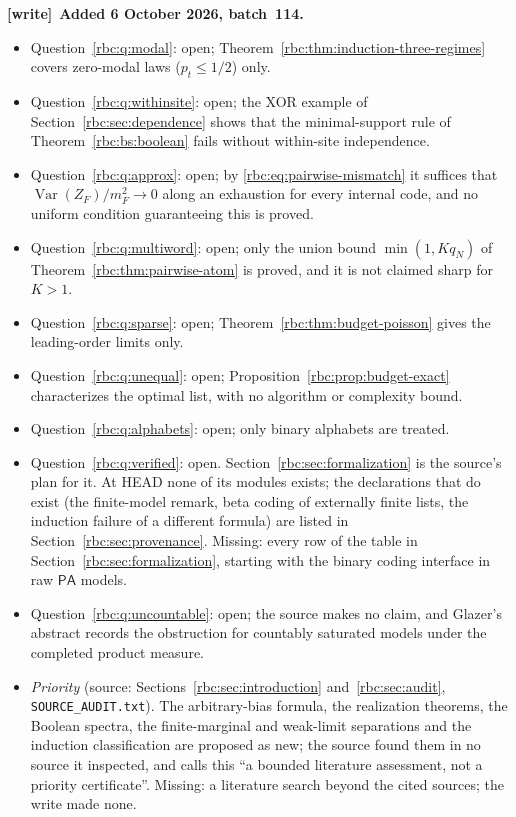 \documentclass[11pt]{article}
\numberwithin{equation}{section}
\theoremstyle{definition}
\theoremstyle{remark}
\newcommand{\PA}{\mathsf{PA}}
\newcommand{\file}[1]{\nolinkurl{#1}}
\newenvironment{writenote}[1][]{\par\smallskip\begingroup\small
 \noindent\textbf{[write]}\if\relax\detokenize{#1}\relax\else~\textbf{#1.}\fi\ }%
 {\par\endgroup\smallskip}
\begin{document}
\begin{writenote}[Added 6 October 2026, batch~114]
\begin{itemize}
 nothing is known here.
\item Question~\ref{rbc:q:modal}: open; Theorem~\ref{rbc:thm:induction-three-regimes}
 covers zero-modal laws ($p_t\le1/2$) only.
\item Question~\ref{rbc:q:withinsite}: open; the XOR example of
 Section~\ref{rbc:sec:dependence} shows that the minimal-support rule of
 Theorem~\ref{rbc:bs:boolean} fails without within-site independence.
\item Question~\ref{rbc:q:approx}: open; by \eqref{rbc:eq:pairwise-mismatch}
 it suffices that $\operatorname{Var}(Z_F)/m_F^2\to0$ along an exhaustion for
 every internal code, and no uniform condition guaranteeing this is proved.
\item Question~\ref{rbc:q:multiword}: open; only the union bound
 $\min(1,Kq_N)$ of Theorem~\ref{rbc:thm:pairwise-atom} is proved, and it is
 not claimed sharp for $K>1$.
\item Question~\ref{rbc:q:sparse}: open; Theorem~\ref{rbc:thm:budget-poisson}
 gives the leading-order limits only.
\item Question~\ref{rbc:q:unequal}: open; Proposition~\ref{rbc:prop:budget-exact}
 characterizes the optimal list, with no algorithm or complexity bound.
\item Question~\ref{rbc:q:alphabets}: open; only binary alphabets are treated.
\item Question~\ref{rbc:q:verified}: open. Section~\ref{rbc:sec:formalization}
 is the source's plan for it. At HEAD none of its modules exists; the
 declarations that do exist (the finite-model remark, beta coding of
 externally finite lists, the induction failure of a different formula) are
 listed in Section~\ref{rbc:sec:provenance}. Missing: every row of the table
 in Section~\ref{rbc:sec:formalization}, starting with the binary coding
 interface in raw $\PA$ models.
\item Question~\ref{rbc:q:uncountable}: open; the source makes no claim, and
 Glazer's abstract records the obstruction for countably saturated models
 under the completed product measure.
\item \emph{Priority} (source: Sections~\ref{rbc:sec:introduction}
 and~\ref{rbc:sec:audit}, \file{SOURCE_AUDIT.txt}). The arbitrary-bias
 formula, the realization theorems, the Boolean spectra, the
 finite-marginal and weak-limit separations and the induction classification
 are proposed as new; the source found them in no source it inspected, and
 calls this ``a bounded literature assessment, not a priority certificate''.
 Missing: a literature search beyond the cited sources; the write made none.
\end{itemize}
\end{writenote}
\end{document}
